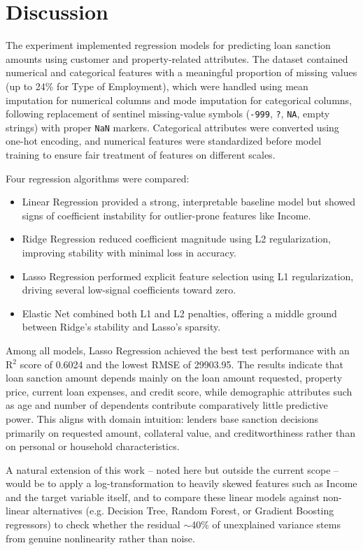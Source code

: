 \documentclass[12pt,a4paper]{article}
\begin{document}
\section{Discussion}

The experiment implemented regression models for predicting loan sanction amounts using customer and property-related attributes. The dataset contained numerical and categorical features with a meaningful proportion of missing values (up to 24\% for Type of Employment), which were handled using mean imputation for numerical columns and mode imputation for categorical columns, following replacement of sentinel missing-value symbols (\texttt{-999}, \texttt{?}, \texttt{NA}, empty strings) with proper \texttt{NaN} markers. Categorical attributes were converted using one-hot encoding, and numerical features were standardized before model training to ensure fair treatment of features on different scales.

Four regression algorithms were compared:
\begin{itemize}
\item Linear Regression provided a strong, interpretable baseline model but showed signs of coefficient instability for outlier-prone features like Income.
\item Ridge Regression reduced coefficient magnitude using L2 regularization, improving stability with minimal loss in accuracy.
\item Lasso Regression performed explicit feature selection using L1 regularization, driving several low-signal coefficients toward zero.
\item Elastic Net combined both L1 and L2 penalties, offering a middle ground between Ridge's stability and Lasso's sparsity.
\end{itemize}

Among all models, Lasso Regression achieved the best test performance with an R$^2$ score of 0.6024 and the lowest RMSE of 29903.95. The results indicate that loan sanction amount depends mainly on the loan amount requested, property price, current loan expenses, and credit score, while demographic attributes such as age and number of dependents contribute comparatively little predictive power. This aligns with domain intuition: lenders base sanction decisions primarily on requested amount, collateral value, and creditworthiness rather than on personal or household characteristics.

A natural extension of this work -- noted here but outside the current scope -- would be to apply a log-transformation to heavily skewed features such as Income and the target variable itself, and to compare these linear models against non-linear alternatives (e.g. Decision Tree, Random Forest, or Gradient Boosting regressors) to check whether the residual $\sim$40\% of unexplained variance stems from genuine nonlinearity rather than noise.
\end{document}
